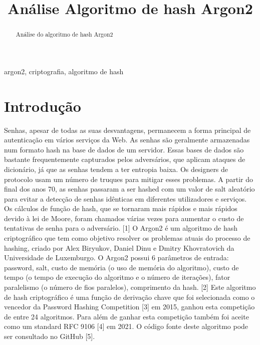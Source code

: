 \documentclass[conference]{IEEEtran}
\begin{document}
\title{Análise Algoritmo de hash Argon2\\
}

\author{
}

\maketitle

\begin{abstract}
Análise do algoritmo de hash Argon2
\end{abstract}

\begin{IEEEkeywords}
argon2, criptografia, algoritmo de hash
\end{IEEEkeywords}

\section{Introdução}
Senhas, apesar de todas as suas desvantagens, permanecem a forma principal de autenticação em vários serviços da Web. 
As senhas são geralmente armazenadas num formato hash na base de dados de um servidor. 
Essas bases de dados são bastante frequentemente capturados pelos adversários, que aplicam ataques de dicionário, 
já que as senhas tendem a ter entropia baixa. Os designers de protocolo usam um número de truques para mitigar esses problemas. 
A partir do final dos anos 70, as senhas passaram a ser hashed com um valor de salt aleatório 
para evitar a detecção de senhas idênticas em diferentes utilizadores e serviços. 
Os cálculos de função de hash, que se tornaram mais rápidos e mais rápidos devido à lei de Moore, 
foram chamados várias vezes para aumentar o custo de tentativas de senha para o adversário. [1]
O Argon2 é um algoritmo de hash criptográfico que tem como objetivo resolver os problemas atuais do processo de hashing, 
criado por Alex Biryukov, Daniel Dinu e Dmitry Khovratovich da Universidade de Luxemburgo. 
O Argon2 possui 6 parâmetros de entrada: password, salt, custo de memória (o uso de memória do algoritmo), 
custo de tempo (o tempo de execução do algoritmo e o número de iterações), fator paralelismo (o número de fios paralelos), 
comprimento da hash. [2]
Este algoritmo de hash criptográfico é uma função de derivação chave que foi selecionada como o vencedor da 
Password Hashing Competition [3] em 2015, ganhou esta competição de entre 24 algoritmos. 
Para além de ganhar esta competição também foi aceite como um standard RFC 9106 [4] em 2021.
O código fonte deste algoritmo pode ser consultado no GitHub [5].
\end{document}
